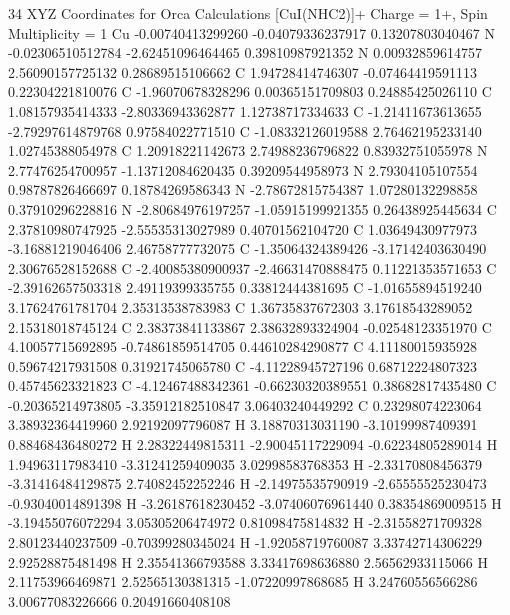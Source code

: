 \documentclass{article}
\begin{document}
34 
XYZ Coordinates for Orca Calculations 
[CuI(NHC2)]+ 
Charge = 1+, Spin Multiplicity = 1 
  Cu  -0.00740413299260     -0.04079336237917      0.13207803040467 
  N   -0.02306510512784     -2.62451096464465      0.39810987921352 
  N   0.00932859614757      2.56090157725132      0.28689515106662 
  C   1.94728414746307     -0.07464419591113      0.22304221810076 
  C   -1.96070678328296      0.00365151709803      0.24885425026110 
  C   1.08157935414333     -2.80336943362877      1.12738717334633 
  C   -1.21411673613655     -2.79297614879768      0.97584022771510 
  C   -1.08332126019588      2.76462195233140      1.02745388054978 
  C   1.20918221142673      2.74988236796822      0.83932751055978 
  N   2.77476254700957     -1.13712084620435      0.39209544958973 
  N   2.79304105107554      0.98787826466697      0.18784269586343 
  N   -2.78672815754387      1.07280132298858      0.37910296228816 
  N   -2.80684976197257     -1.05915199921355      0.26438925445634 
  C   2.37810980747925     -2.55535313027989      0.40701562104720 
  C   1.03649430977973     -3.16881219046406      2.46758777732075 
  C   -1.35064324389426     -3.17142403630490      2.30676528152688 
  C   -2.40085380900937     -2.46631470888475      0.11221353571653 
  C   -2.39162657503318      2.49119399335755      0.33812444381695 
  C   -1.01655894519240      3.17624761781704      2.35313538783983 
  C   1.36735837672303      3.17618543289052      2.15318018745124 
  C   2.38373841133867      2.38632893324904     -0.02548123351970 
  C   4.10057715692895     -0.74861859514705      0.44610284290877 
  C   4.11180015935928      0.59674217931508      0.31921745065780 
  C   -4.11228945727196      0.68712224807323      0.45745623321823 
  C   -4.12467488342361     -0.66230320389551      0.38682817435480 
  C   -0.20365214973805     -3.35912182510847      3.06403240449292 
  C   0.23298074223064      3.38932364419960      2.92192097796087 
  H   3.18870313031190     -3.10199987409391      0.88468436480272 
  H   2.28322449815311     -2.90045117229094     -0.62234805289014 
  H   1.94963117983410     -3.31241259409035      3.02998583768353 
  H   -2.33170808456379     -3.31416484129875      2.74082452252246 
  H   -2.14975535790919     -2.65555525230473     -0.93040014891398 
  H   -3.26187618230452     -3.07406076961440      0.38354869009515 
  H   -3.19455076072294      3.05305206474972      0.81098475814832 
  H   -2.31558271709328      2.80123440237509     -0.70399280345024 
  H   -1.92058719760087      3.33742714306229      2.92528875481498 
  H   2.35541366793588      3.33417698636880      2.56562933115066 
  H   2.11753966469871      2.52565130381315     -1.07220997868685 
  H   3.24760556566286      3.00677083226666      0.20491660408108 
\end{document}
